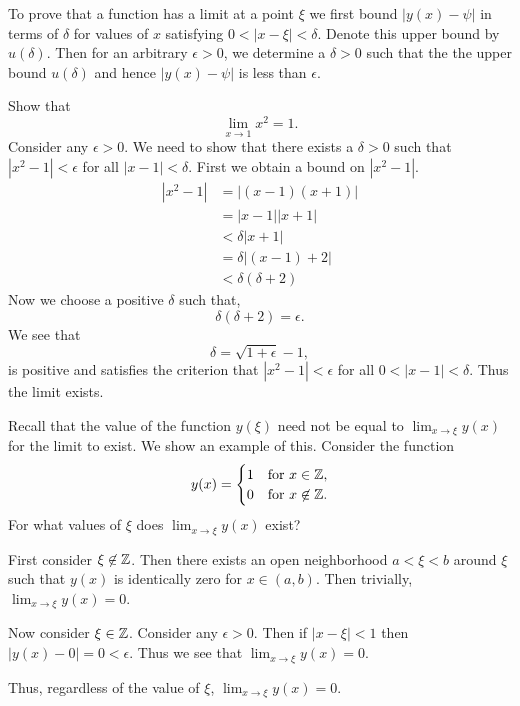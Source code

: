 To prove that a function has a limit at a point $\xi$ we first bound 
$|y(x) - \psi|$ in terms of $\delta$ for values of $x$ satisfying
$0 < |x - \xi| < \delta$.  Denote this upper bound by $u(\delta)$.  
Then for an arbitrary $\epsilon > 0$, we determine a $\delta > 0$ such that 
the the upper bound $u(\delta)$ and hence $|y(x) - \psi|$ is less than
$\epsilon$.




\begin{Example}
  Show that 
  \[
  \lim_{x \to 1} x^2 = 1.
  \]
  Consider any $\epsilon > 0$.  We need to show that there exists a $\delta > 0$
  such that $|x^2 - 1| < \epsilon$ for all $|x-1| < \delta$.  First we obtain
  a bound on $|x^2 - 1|$.
  \begin{align*}
    |x^2 - 1|
    &= | (x-1)(x+1) | \\
    &= | x-1 | | x+1 | \\
    &< \delta | x+1 | \\
    &= \delta |(x-1) + 2| \\
    &< \delta ( \delta + 2 ) 
  \end{align*}
  Now we choose a positive $\delta$ such that,
  \[
  \delta ( \delta + 2 ) = \epsilon.
  \]
  We see that
  \[
  \delta = \sqrt{1 + \epsilon} - 1,
  \]
  is positive and satisfies the criterion that $|x^2 - 1| < \epsilon$ for all
  $0 < |x-1| < \delta$.  Thus the limit exists.
\end{Example}






\begin{Example}
  \label{yxineqlim}
  Recall that the value of the function $y(\xi)$ need not be equal to 
  $\lim_{x \to \xi} y(x)$ for the limit to exist.  We show an example of this.
  Consider the function
  \[
  y(x) = 
  \begin{cases}
    1 & \mathrm{for}\ x \in \mathbb{Z}, \\
    0 & \mathrm{for}\ x \not\in \mathbb{Z}.
  \end{cases}
  \]
  For what values of $\xi$ does $\lim_{x \to \xi} y(x)$ exist?

  First consider $\xi \not\in \mathbb{Z}$.  Then there exists an open 
  neighborhood $a<\xi<b$ around $\xi$ such that $y(x)$ is identically zero for
  $x \in (a,b)$.  Then trivially, $\lim_{x \to \xi} y(x) = 0$.

  Now consider $\xi \in \mathbb{Z}$.  Consider any $\epsilon > 0$.  Then if
  $|x - \xi| < 1$ then $|y(x) - 0| = 0 < \epsilon$.  Thus we see that
  $\lim_{x \to \xi} y(x) = 0$.

  Thus, regardless of the value of $\xi$, $\lim_{x \to \xi} y(x) = 0$.
\end{Example}




